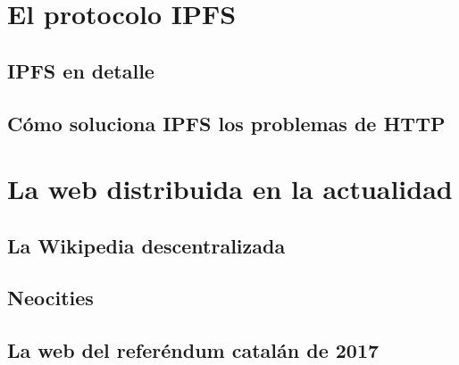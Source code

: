 \documentclass[12pt]{article} %
\begin{document}


\section{El protocolo IPFS} %
\label{sec:el_protocolo_ipfs}

\subsection{IPFS en detalle} %
\label{sub:ipfs_en_detalle}


\subsection{Cómo soluciona IPFS los problemas de HTTP} %
\label{sub:cómo_soluciona_ipfs_los_problemas_de_http}



\section{La web distribuida en la actualidad} %
\label{sec:la_web_distribuida_en_la_actualidad}

\subsection{La Wikipedia descentralizada} %
\label{sub:la_wikipedia_descentralizada}


\subsection{Neocities} %
\label{sub:neocities}


\subsection{La web del referéndum catalán de 2017} %
\label{sub:la_web_del_referéndum_catalán_de_2017}




\newpage
\printbibliography
\end{document}
